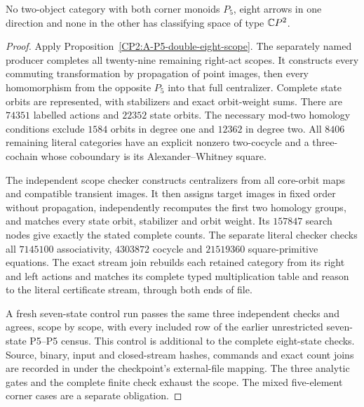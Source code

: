 \begin{proposition}
\label{CP2:A-P5-double-eight-complete}
No two-object category with both corner monoids $P_5$,
eight arrows in one direction and none in the other has
classifying space of type $\mathbb{C}P^2$.
\end{proposition}
\begin{proof}
Apply Proposition~\ref{CP2:A-P5-double-eight-scope}.
The separately named producer
 completes all
twenty-nine remaining right-act scopes. It constructs
every commuting transformation by propagation of point
images, then every homomorphism from the opposite $P_5$
into that full centralizer. Complete state orbits are
represented, with stabilizers and exact orbit-weight sums.
There are $74351$ labelled actions and $22352$ state orbits.
The necessary mod-two homology conditions exclude $1584$
orbits in degree one and $12362$ in degree two. All $8406$
remaining literal categories have an explicit nonzero
two-cocycle and a three-cochain whose coboundary is its
Alexander--Whitney square.

The independent scope checker
 constructs
centralizers from all core-orbit maps and compatible
transient images. It then assigns target images in fixed
order without propagation, independently recomputes the
first two homology groups, and matches every state orbit,
stabilizer and orbit weight. Its $157847$ search nodes
give exactly the stated complete counts. The separate
literal checker checks all $7145100$ associativity,
$4303872$ cocycle and $21519360$ square-primitive equations.
The exact stream join rebuilds each retained category
from its right and left actions and matches its complete
typed multiplication table and reason to the literal
certificate stream, through both ends of file.

A fresh seven-state control run passes the same three
independent checks and agrees, scope by scope, with every
included row of the earlier unrestricted seven-state
P5--P5 census. This control is additional to the complete
eight-state checks. Source, binary, input and closed-stream
hashes, commands and exact count joins are recorded in
under the checkpoint's external-file mapping. The three
analytic gates and the complete finite check exhaust the
scope. The mixed five-element corner cases are a separate
obligation.
\end{proof}
